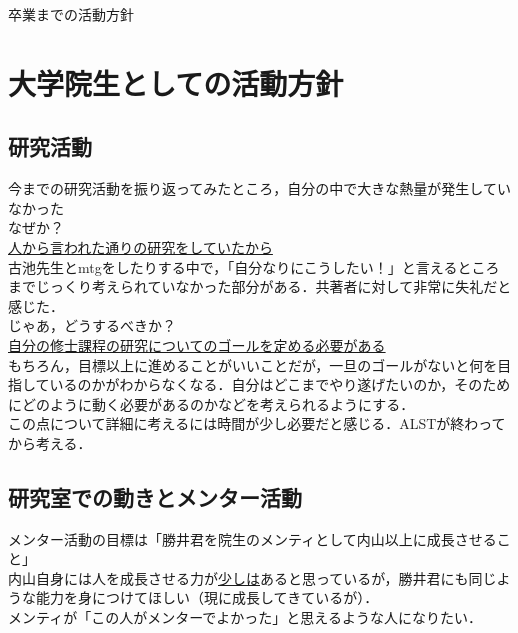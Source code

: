 \documentclass[a4paper,12pt]{ltjsarticle}
\begin{document}
  \begin{center}
    {\huge 卒業までの活動方針}
  \end{center}

  \section{大学院生としての活動方針}
  \subsection{研究活動}
  今までの研究活動を振り返ってみたところ，自分の中で大きな熱量が発生していなかった\\

  なぜか？\\

  \underline{人から言われた通りの研究をしていたから}\\

  古池先生とmtgをしたりする中で，「自分なりにこうしたい！」と言えるところまでじっくり考えられていなかった部分がある．共著者に対して非常に失礼だと感じた．\\

  じゃあ，どうするべきか？\\

  \underline{自分の修士課程の研究についてのゴールを定める必要がある}\\

  もちろん，目標以上に進めることがいいことだが，一旦のゴールがないと何を目指しているのかがわからなくなる．自分はどこまでやり遂げたいのか，そのためにどのように動く必要があるのかなどを考えられるようにする．\\

  この点について詳細に考えるには時間が少し必要だと感じる．ALSTが終わってから考える．\\

  \clearpage

  \subsection{研究室での動きとメンター活動}
  メンター活動の目標は「勝井君を院生のメンティとして内山以上に成長させること」\\

  内山自身には人を成長させる力が\underline{少しは}あると思っているが，勝井君にも同じような能力を身につけてほしい（現に成長してきているが）．\\

  メンティが「この人がメンターでよかった」と思えるような人になりたい．\\
\end{document}
